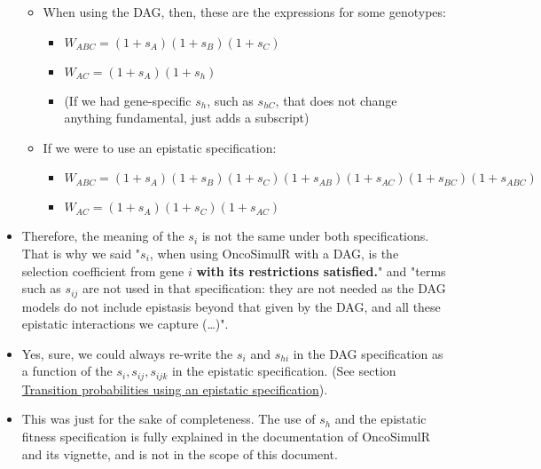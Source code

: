 \documentclass[11pt]{article}
\begin{document}
\begin{itemize}
\begin{itemize}
\item When using the DAG, then, these are
the expressions for some genotypes:
\begin{itemize}
\item \(W_{ABC} = (1 + s_A) (1 + s_B) (1 + s_C)\)
\item \(W_{AC}  = (1 + s_A) (1 + s_h)\)
\item (If we had gene-specific \(s_h\), such as \(s_{hC}\), that does not
change anything fundamental, just adds a subscript)
\end{itemize}
\item If we were to use an epistatic specification:
\begin{itemize}
\item \(W_{ABC} = (1 + s_A) (1 + s_B) (1 + s_C) (1 + s_{AB}) (1 + s_{AC}) (1 + s_{BC}) (1 + s_{ABC})\)
\item \(W_{AC}  = (1 + s_A) (1 + s_C) (1 + s_{AC})\)
\end{itemize}
\end{itemize}

\item Therefore, the meaning of the \(s_i\) is not the same under both specifications. That is why we said "\(s_i\), when using OncoSimulR with a DAG, is the selection coefficient from gene \(i\) \textbf{with its restrictions satisfied.}" and "terms such as \(s_{ij}\) are not used in that specification: they are not needed as the DAG models do not include epistasis beyond that given by the DAG, and all these epistatic interactions we capture (\ldots{})".

\item Yes, sure, we could always re-write the \(s_{i}\) and \(s_{hi}\) in the DAG specification as a function of the \(s_i, s_{ij}, s_{ijk}\) in the epistatic specification. (See section \hyperref[sec:orge68f649]{Transition probabilities using an epistatic specification}).

\item This was just for the sake of completeness. The use of \(s_h\) and the epistatic fitness specification is fully explained in the documentation of OncoSimulR and its vignette, and is not in the scope of this document.
\end{itemize}
\end{document}
